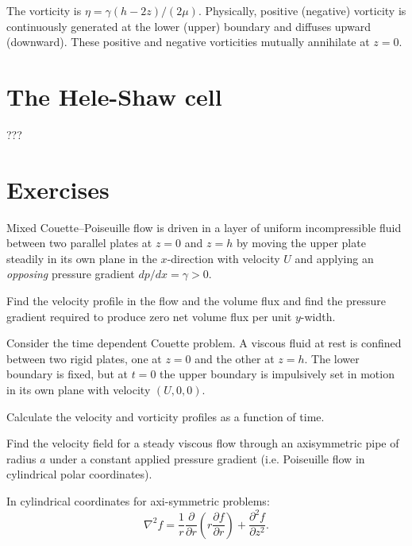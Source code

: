 \documentclass[10pt]{report}
\begin{document}
The vorticity is $\eta ={\gamma (h-2z)}  / {\left( {2\mu } \right)}$. Physically, positive
(negative) vorticity is continuously generated at the lower (upper) boundary
and diffuses upward (downward). These positive and negative vorticities
mutually annihilate at $z = 0$.

\section{The Hele-Shaw cell}

???

\divider
\pagebreak

\section{Exercises}


\begin{questionstar}
	Mixed Couette--Poiseuille flow is driven in a layer of uniform
	incompressible fluid between two parallel plates at $z = 0$ and $z = h$ by
	moving the upper plate steadily in its own plane in the $x$-direction with
	velocity $U$ and applying an \textit{opposing} pressure gradient ${dp} /  {dx}=\gamma >0$.

	Find the velocity profile in the flow and the volume flux and
	find the pressure gradient required to produce zero net volume flux per unit $y$-width.
\label{qn:mixed-couette-poiseuille}
\end{questionstar}

\begin{question}
	Consider the time dependent Couette problem. A viscous fluid at rest is
	confined between two rigid plates, one at $z = 0$ and the other at $z = h$. The
	lower boundary is fixed, but at $t = 0$ the upper boundary is impulsively set
	in motion in its own plane with velocity $(U,0,0)$.

	Calculate the velocity and vorticity profiles as a function of time.
\end{question}

\begin{questionstar}
	Find the velocity field for a steady viscous flow through an axisymmetric pipe of radius $a$
	under a constant applied   pressure gradient (i.e. Poiseuille flow in cylindrical polar coordinates).

	In cylindrical coordinates for axi-symmetric problems:
	\[ \nabla^2 f  = \frac{1}{r} \frac{\partial}{\partial r}
	             \left( r\frac{\partial f}{\partial r}\right) + \frac{\partial^2 f}{\partial z^2}. \]
\label{qn:steady-cyl-poiseuille-flow}
\end{questionstar}
\end{document}
